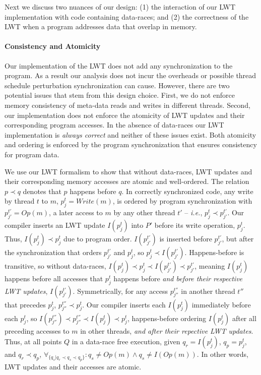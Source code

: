 \documentclass[preprint,9pt]{sigplanconf}
\newcommand{\lwt}{LWT\xspace}
\begin{document}
Next we discuss two nuances of our design: (1) the interaction of our \lwt
implementation with code containing data-races; and (2) the correctness of the
\lwt when a program addresses data that overlap in memory. 

\paragraph{Consistency and Atomicity}

Our implementation of the \lwt does not add any synchronization to the program.
As a result our analysis does not incur the overheads or possible thread
schedule perturbation synchronization can cause.  However, there are two
potential issues that stem from this design choice. First, we do not enforce
memory consistency of meta-data reads and writes in different threads.  Second,
our implementation does not enforce the atomicity of \lwt updates and their
corresponding program accesses.  In the absence of data-races our \lwt
implementation is {\em always correct} and neither of these issues exist.  Both
atomicity and ordering is enforced by the program synchronization that ensures
consistency for program data.   

We use our \lwt formalism to show that without data-races, \lwt updates and
their corresponding memory accesses are atomic and well-ordered.  The relation
$p \prec q$ denotes that $p$ happens before $q$.  In correctly synchronized
code, any write by thread $t$ to $m$, $p^{t}_{j} = Write(m)$, is ordered by
program synchronization with $p^{t'}_{j'} = Op(m)$, a later access to $m$ by
any other thread $t'$ -- {\em i.e.}, $p^{t}_{j} \prec p^{t'}_{j'}$.  Our
compiler inserts an \lwt update $I(p^{t}_{j})$ into $P'$ before its write
operation, $p^{t}_{j}$. Thus, $I(p^{t}_{j}) \prec p^{t}_{j}$ due to program
order.  $I(p^{t'}_{j'})$ is inserted before $p^{t'}_{j'}$, but after the synchronization that orders $p^{t'}_{j'}$ and $p^{t}_{j}$, so $p^{t}_{j} \prec I(p^{t'}_{j'})$.  Happens-before is transitive, so without data-races, $I(p^{t}_{j})
\prec p^{t}_{j} \prec I(p^{t'}_{j'}) \prec p^{t'}_{j'}$, meaning $I(p^{t}_{j})$
happens before all accesses that $p^{t}_{j}$ happens before {\em and before
their respective \lwt updates}, $I(p^{t'}_{j'})$.  Symmetrically, for any
access $p^{t''}_{j''}$ in another thread $t''$ that precedes $p^{t}_{j}$,
$p^{t''}_{j''} \prec p^{t}_{j}$.  Our compiler inserts each $I(p^{t}_{j})$
immediately before each $p^{t}_{j}$, so $I(p^{t''}_{j''}) \prec p^{t''}_{j''}
\prec I(p^{t}_{j}) \prec p^{t}_{j}$, happens-before ordering $I(p^{t}_{j})$
after all preceding accesses to $m$ in other threads, {\em and after their
repective \lwt updates}.  Thus, at all points $Q$ in a data-race free
execution, given $q_r = I(p^{t}_{j})$, $q_p = p^{t}_{j}$, and $q_r \prec q_p$,
$\forall_{ \{q_s | q_r \prec q_s \prec q_p \}}: q_s \ne Op(m) \wedge q_s \ne
I(Op(m)) $.  In other words, \lwt updates and their accesses are atomic.
\end{document}
